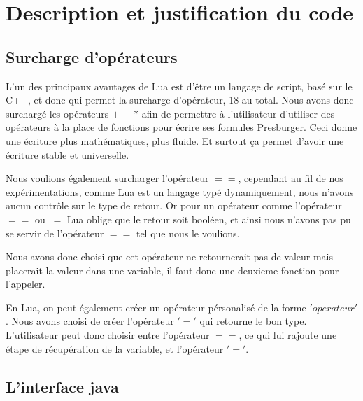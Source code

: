 \section{Description et justification du code}

\subsection{Surcharge d'opérateurs}

L'un des principaux avantages de Lua est d'être un langage de script, basé sur le C++, et donc qui permet la surcharge d'opérateur, 18 au total. Nous avons donc surchargé les opérateurs $+$ $-$ $*$ afin de permettre à l'utilisateur d'utiliser des opérateurs à la place de fonctions pour écrire ses formules Presburger. Ceci donne une écriture plus mathématiques, plus fluide. Et surtout ça permet d'avoir une écriture stable et universelle.\\\par

Nous voulions également surcharger l'opérateur $==$, cependant au fil de nos expérimentations, comme Lua est un langage typé dynamiquement, nous n'avons aucun contrôle sur le type de retour. Or pour un opérateur comme l'opérateur $==$ ou $~=$ Lua oblige que le retour soit booléen, et ainsi nous n'avons pas pu se servir de l'opérateur $==$ tel que nous le voulions.\\\par
 
Nous avons donc choisi que cet opérateur ne retournerait pas de valeur mais placerait la valeur dans une variable, il faut donc une deuxieme fonction pour l'appeler.\\\par

En Lua, on peut également créer un opérateur pérsonalisé de la forme $'operateur'$. Nous avons choisi de créer l'opérateur $'='$ qui retourne le bon type. L'utilisateur peut donc choisir entre l'opérateur $==$, ce qui lui rajoute une étape de récupération de la variable, et l'opérateur $'='$.

\subsection{L’interface java}

